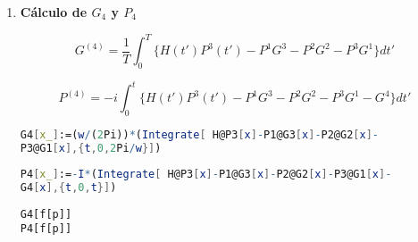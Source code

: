 \begin{itemize}
\begin{enumerate}
\begin{lstlisting}[language=Mathematica]
G3[x_]:=(w/(2Pi))*(Integrate[ H@P2[x]-P1@G2[x]-P2@G1[x],
{t,0,2Pi/w}])
\end{lstlisting}

\begin{lstlisting}
P3[x_]:=-I*(Integrate[ H@P2[x]-P1@G2[x]-P2@G1[x]-G3[x],
{t,0,t}]) 
\end{lstlisting}

\begin{equation}
    G^{(3)}=\frac{a^2A\epsilon^2\cos(ap)}{2\omega^2}\mathbb{I}
\end{equation}

\begin{equation}
         \begin{split}         P^{(3)}=&\frac{\epsilon^2}{12\omega^3}[3ia^2A(8\sin(\omega t)-3\sin(2\omega t))\cos(ap)\mathbb{I} +\\&+48iaA\sin^2(\frac{\omega t}{2})\sin(\omega t)\sin(ap)\frac{\partial}{\partial p}+\\&+ 2i\epsilon\sin^3(\omega t)\frac{\partial^3}{\partial p^3}]
    \end{split}
\end{equation}

\item \textbf{Cálculo de $G_4$ y $P_4$}

\begin{equation}
    G^{(4)}=\frac{1}{T}\int^{T}_{0}\{ H(t')P^{3}(t')- P^{1}G^{3}- P^{2}G^{2}- P^{3}G^{1}\}dt'
\end{equation}

\begin{equation}
    P^{(4)}=-i\int^{t}_{0}\{ H(t')P^{3}(t')- P^{1}G^{3}-P^{2}G^{2}-P^{3}G^{1}-G^{4}\}dt'
\end{equation}

\begin{lstlisting}[language=Mathematica]
G4[x_]:=(w/(2Pi))*(Integrate[ H@P3[x]-P1@G3[x]-P2@G2[x]-
P3@G1[x],{t,0,2Pi/w}])
\end{lstlisting}

\begin{lstlisting}[language=Mathematica]
P4[x_]:=-I*(Integrate[ H@P3[x]-P1@G3[x]-P2@G2[x]-P3@G1[x]-
G4[x],{t,0,t}]) 
\end{lstlisting}

\begin{lstlisting}
G4[f[p]]
P4[f[p]]
\end{lstlisting}



\end{enumerate}
\end{itemize}

